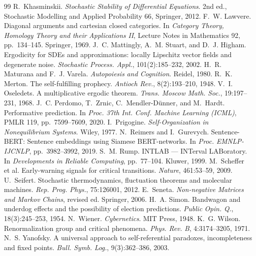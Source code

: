 \documentclass[11pt]{article}
\theoremstyle{plain}
\theoremstyle{definition}
\theoremstyle{remark}
\begin{document}
\begin{thebibliography}{99}
 R.~Khasminskii. \emph{Stochastic Stability of Differential Equations}. 2nd ed., Stochastic Modelling and Applied Probability 66, Springer, 2012.
 F.~W. Lawvere. Diagonal arguments and cartesian closed categories. In \emph{Category Theory, Homology Theory and their Applications II}, Lecture Notes in Mathematics 92, pp.~134--145. Springer, 1969.
 J.~C. Mattingly, A.~M. Stuart, and D.~J. Higham. Ergodicity for SDEs and approximations: locally Lipschitz vector fields and degenerate noise. \emph{Stochastic Process. Appl.}, 101(2):185--232, 2002.
 H.~R. Maturana and F.~J. Varela. \emph{Autopoiesis and Cognition}. Reidel, 1980.
 R.~K. Merton. The self-fulfilling prophecy. \emph{Antioch Rev.}, 8(2):193--210, 1948.
 V.~I. Oseledets. A multiplicative ergodic theorem. \emph{Trans. Moscow Math. Soc.}, 19:197--231, 1968.
 J.~C. Perdomo, T.~Zrnic, C.~Mendler-D\"unner, and M.~Hardt. Performative prediction. In \emph{Proc. 37th Int. Conf. Machine Learning (ICML)}, PMLR 119, pp.~7599--7609, 2020.
 I.~Prigogine. \emph{Self-Organization in Nonequilibrium Systems}. Wiley, 1977.
 N.~Reimers and I.~Gurevych. Sentence-BERT: Sentence embeddings using Siamese BERT-networks. In \emph{Proc. EMNLP-IJCNLP}, pp.~3982--3992, 2019.
 S.~M. Rump. INTLAB --- INTerval LABoratory. In \emph{Developments in Reliable Computing}, pp.~77--104. Kluwer, 1999.
 M.~Scheffer et al. Early-warning signals for critical transitions. \emph{Nature}, 461:53--59, 2009.
 U.~Seifert. Stochastic thermodynamics, fluctuation theorems and molecular machines. \emph{Rep. Prog. Phys.}, 75:126001, 2012.
 E.~Seneta. \emph{Non-negative Matrices and Markov Chains}, revised ed. Springer, 2006.
 H.~A. Simon. Bandwagon and underdog effects and the possibility of election predictions. \emph{Public Opin. Q.}, 18(3):245--253, 1954.
 N.~Wiener. \emph{Cybernetics}. MIT Press, 1948.
 K.~G. Wilson. Renormalization group and critical phenomena. \emph{Phys. Rev. B}, 4:3174--3205, 1971.
 N.~S. Yanofsky. A universal approach to self-referential paradoxes, incompleteness and fixed points. \emph{Bull. Symb. Log.}, 9(3):362--386, 2003.

\end{thebibliography}
\end{document}
